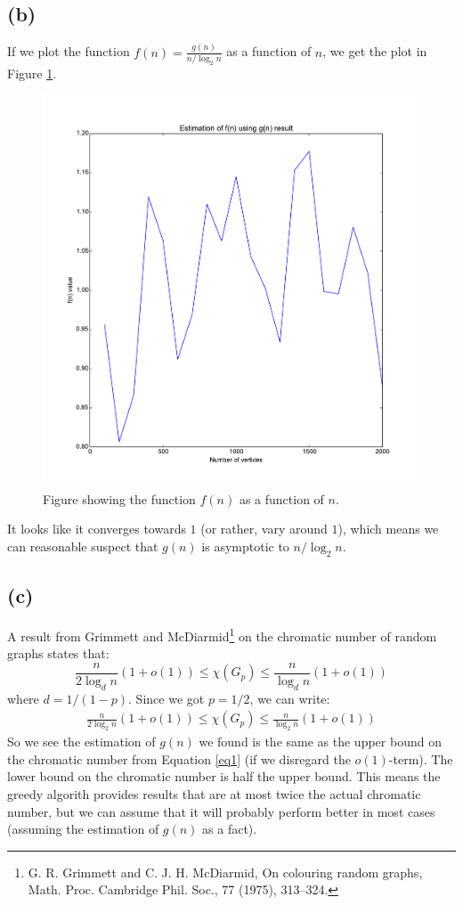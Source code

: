 \documentclass[a4paper]{article}
\begin{document}
\subsection{(b)}
If we plot the function $f(n)=\frac{g(n)}{n/\log_2 n}$ as a function of $n$, we get the plot in Figure \ref{2}.
\begin{figure}[H]
  \centering
  \captionsetup{justification=centering}
  \includegraphics[width=\textwidth]{fig2.pdf}
  \caption{Figure showing the function $f(n)$ as a function of $n$.}
  \label{2}
\end{figure}
It looks like it converges towards $1$ (or rather, vary around $1$), which means we can reasonable suspect that $g(n)$ is asymptotic to $n/\log_2 n$.

\newpage
\subsection{(c)}
A result from Grimmett and McDiarmid\footnote{G. R. Grimmett and C. J. H. McDiarmid, On colouring random graphs, Math. Proc. Cambridge Phil. Soc., 77 (1975), 313--324.} on the chromatic number of random graphs states that:
$$
\frac{n}{2\log_d n} \left(1+o(1)\right)\leq \chi(G_p)\leq \frac{n}{\log_d n}\left(1+o(1)\right)
$$
where $d=1/(1-p)$. Since we got $p=1/2$, we can write:
\begin{align}\label{eq1}
\frac{n}{2\log_2 n} \left(1+o(1)\right)\leq \chi(G_p)\leq \frac{n}{\log_2 n}\left(1+o(1)\right)
\end{align}
So we see the estimation of $g(n)$ we found is the same as the upper bound on the chromatic number from Equation \ref{eq1} (if we disregard the $o(1)$-term). The lower bound on the chromatic number is half the upper bound. This means the greedy algorith  provides results that are at most twice the actual chromatic number, but we can assume that it will probably perform better in most cases (assuming the estimation of $g(n)$ as a fact).
\end{document}
